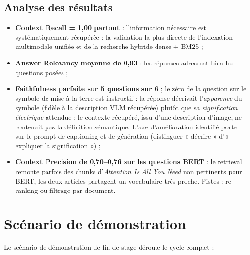 \subsection{Analyse des résultats}

\begin{itemize}
  \item \textbf{Context Recall = 1{,}00 partout} : l'information nécessaire est
        systématiquement récupérée : la validation la plus directe de l'indexation
        multimodale unifiée et de la recherche hybride dense + BM25 ;
  \item \textbf{Answer Relevancy moyenne de 0{,}93} : les réponses adressent bien les
        questions posées ;
  \item \textbf{Faithfulness parfaite sur 5 questions sur 6} ; le zéro de la question sur
        le symbole de mise à la terre est instructif : la réponse décrivait
        l'\emph{apparence} du symbole (fidèle à la description VLM récupérée) plutôt que sa
        \emph{signification électrique} attendue ; le contexte récupéré, issu d'une
        description d'image, ne contenait pas la définition sémantique. L'axe
        d'amélioration identifié porte sur le prompt de captioning et de génération
        (distinguer « décrire » d'« expliquer la signification ») ;
  \item \textbf{Context Precision de 0{,}70--0{,}76 sur les questions BERT} : le retrieval
        remonte parfois des chunks d'\emph{Attention Is All You Need} non pertinents pour
        BERT, les deux articles partagent un vocabulaire très proche. Pistes : re-ranking
        ou filtrage par document.
\end{itemize}


\section{Scénario de démonstration}
\label{sec:demo}

Le scénario de démonstration de fin de stage déroule le cycle complet :

